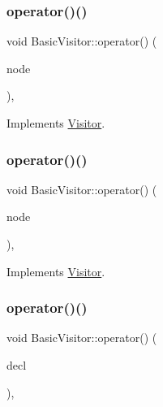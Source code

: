 \subsubsection{\texorpdfstring{operator()()}{operator()()}\hspace{0.1cm}{\footnotesize\ttfamily [49/59]}}
{\footnotesize\ttfamily void Basic\+Visitor\+::operator() (\begin{DoxyParamCaption}\item[{const \hyperlink{struct_arguments}{Arguments} \&}]{node }\end{DoxyParamCaption})\hspace{0.3cm}{\ttfamily [inline]}, {\ttfamily [virtual]}}



Implements \hyperlink{struct_visitor_a73daac2b555cca03beaf9da73bf540c7}{Visitor}.

\mbox{\label{struct_basic_visitor_ad36bb57f0b62f1b48cf7ed4b0c6d378b}} 
\subsubsection{\texorpdfstring{operator()()}{operator()()}\hspace{0.1cm}{\footnotesize\ttfamily [50/59]}}
{\footnotesize\ttfamily void Basic\+Visitor\+::operator() (\begin{DoxyParamCaption}\item[{const \hyperlink{struct_program}{Program} \&}]{node }\end{DoxyParamCaption})\hspace{0.3cm}{\ttfamily [inline]}, {\ttfamily [virtual]}}



Implements \hyperlink{struct_visitor_a768e64f6e6fffb7440e3c1f1a78d9481}{Visitor}.

\mbox{\label{struct_basic_visitor_a2ea35a5ede761a22479ba2be10ad0902}} 
\subsubsection{\texorpdfstring{operator()()}{operator()()}\hspace{0.1cm}{\footnotesize\ttfamily [51/59]}}
{\footnotesize\ttfamily void Basic\+Visitor\+::operator() (\begin{DoxyParamCaption}\item[{const \hyperlink{struct_program_declaration}{Program\+Declaration} \&}]{decl }\end{DoxyParamCaption})\hspace{0.3cm}{\ttfamily [inline]}, {\ttfamily [virtual]}}



